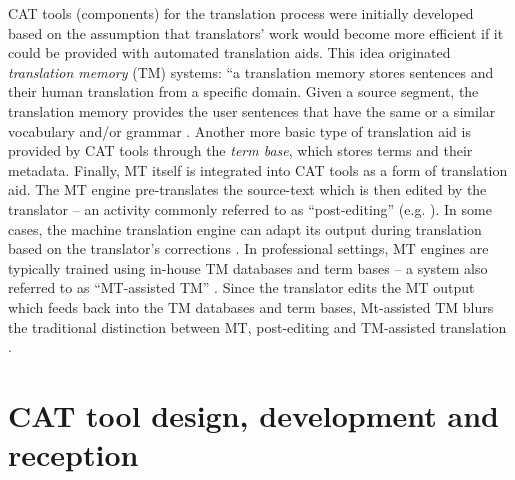 CAT tools (components) for the translation process were initially developed based on the assumption that translators' work would become more efficient if it could be provided with automated translation aids. This idea originated \textit{translation memory} (TM) systems: ``a translation memory stores sentences and their human translation from a specific domain. Given a source segment, the translation memory provides the user sentences that have the same or a similar vocabulary and/or grammar \citep[1]{coppers2018intellingo}. Another more basic type of translation aid is provided by CAT tools through the \textit{term base}, which stores terms and their metadata. Finally, MT itself is integrated into CAT tools as a form of translation aid. The MT engine pre-translates the source-text which is then edited by the translator -- an activity commonly referred to as ``post-editing'' (e.g. \cite{flanagan2014testing}). In some cases, the machine translation engine can adapt its output during translation based on the translator’s corrections \citep[1]{coppers2018intellingo}. In professional settings, MT engines are typically trained using in-house TM databases and term bases -- a system also referred to as ``MT-assisted TM'' \citep{christensen2017mapping}. Since the translator edits the MT output which feeds back into the TM databases and term bases, Mt-assisted TM blurs the traditional distinction between MT, post-editing and TM-assisted translation \citep[9]{christensen2017mapping}.






\section{CAT tool design, development and reception}

